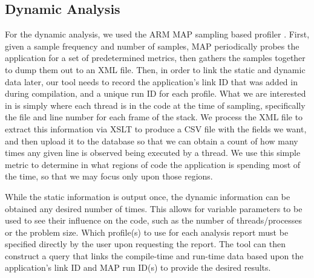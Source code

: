 
\subsection{Dynamic Analysis}
\label{sec:dynamic}
For the dynamic analysis, we used the ARM MAP sampling based profiler \cite{arm-docs}.
First, given a sample frequency and number of samples, MAP periodically probes the application for 
a set of predetermined metrics, then gathers the samples together to dump them out to an \acs{XML} 
file. Then, in order to link the static and dynamic data later, our tool needs to record the application's 
link ID that was added in during compilation, and a unique run ID for each profile.
What we are interested in is simply where each thread is in the code at the time of sampling, 
specifically the file and line number for each frame of the stack.
We process the \acs{XML} file to extract this information via \ac{XSLT} to produce a \acs{CSV} file 
with the fields we want, and then upload it to the database so that we can obtain a count of how 
many 
times any given line is observed being executed by a thread.
We use this simple metric to determine in what regions of code the application is spending most of 
the time, so that we may focus only upon those regions.

While the static information is output once, the dynamic information can be obtained any desired 
number of times.
This allows for variable parameters to be used to see their influence on the code, 
such as the number of threads/processes or the problem size. Which profile(s) to use for each 
analysis report must be specified directly by the user upon requesting the report.
The tool can then construct a query that links the compile-time and run-time data based upon the 
application's link ID and MAP run ID(s) to provide the desired results.
